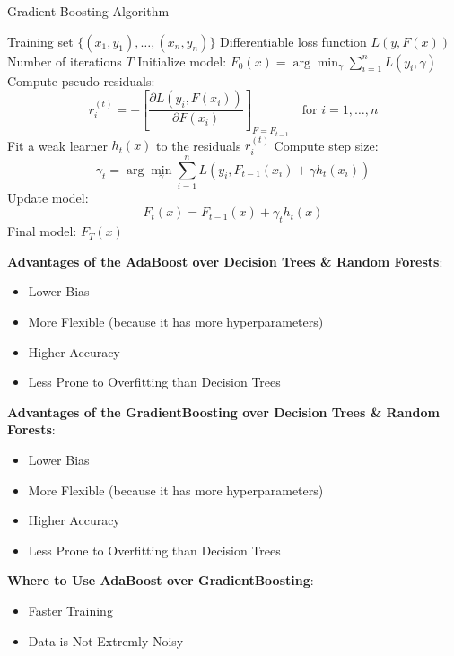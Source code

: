 \documentclass[a4paper,12pt]{article}
\begin{document}
\begin{enumerate}[label=(\alph*)]
    \begin{algorithm}
    \caption{Gradient Boosting Algorithm}
    \begin{algorithmic}[1]
    \REQUIRE Training set $\{(x_1, y_1), \dots, (x_n, y_n)\}$
    \REQUIRE Differentiable loss function $L(y, F(x))$
    \REQUIRE Number of iterations $T$
    \STATE Initialize model: $F_0(x) = \arg\min_{\gamma} \sum_{i=1}^n L(y_i, \gamma)$
        \STATE Compute pseudo-residuals:
        \[
            r_i^{(t)} = -\left[ \frac{\partial L(y_i, F(x_i))}{\partial F(x_i)} \right]_{F=F_{t-1}} \quad \text{for } i = 1, \dots, n
        \]
        \STATE Fit a weak learner $h_t(x)$ to the residuals $r_i^{(t)}$
        \STATE Compute step size:
        \[
            \gamma_t = \arg\min_{\gamma} \sum_{i=1}^n L(y_i, F_{t-1}(x_i) + \gamma h_t(x_i))
        \]
        \STATE Update model:
        \[
            F_t(x) = F_{t-1}(x) + \gamma_t h_t(x)
        \]
    \ENDFOR
    \RETURN Final model: $F_T(x)$
    \end{algorithmic}
    \end{algorithm}

    \noindent\textbf{Advantages of the AdaBoost over Decision Trees \& Random Forests}:
    \begin{itemize}
        \item Lower Bias
        \item More Flexible (because it has more hyperparameters)
        \item Higher Accuracy 
        \item Less Prone to Overfitting than Decision Trees
    \end{itemize} 

    \noindent\textbf{Advantages of the GradientBoosting over Decision Trees \& Random Forests}:
    \begin{itemize}
        \item Lower Bias
        \item More Flexible (because it has more hyperparameters)
        \item Higher Accuracy 
        \item Less Prone to Overfitting than Decision Trees
    \end{itemize} 

    \noindent\textbf{Where to Use AdaBoost over GradientBoosting}:
    \begin{itemize}
        \item Faster Training
        \item Data is Not Extremly Noisy
    \end{itemize} 


\end{enumerate}
\end{document}
